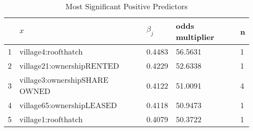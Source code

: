 \begin{table}[ht]
\centering
\begin{tabular}{rllll}
  \hline
 & $x$ & $\beta_j$ & odds multiplier & n \\ 
  \hline
1 & village4:roofthatch & 0.4483 & 56.5631 & 1 \\ 
  2 & village21:ownershipRENTED & 0.4229 & 52.6338 & 1 \\ 
  3 & village3:ownershipSHARE OWNED & 0.4122 & 51.0091 & 4 \\ 
  4 & village65:ownershipLEASED & 0.4118 & 50.9473 & 1 \\ 
  5 & village1:roofthatch & 0.4079 & 50.3722 & 1 \\ 
   \hline
\end{tabular}
\caption{Most Significant Positive Predictors} 
\label{tab:pos}
\end{table}
